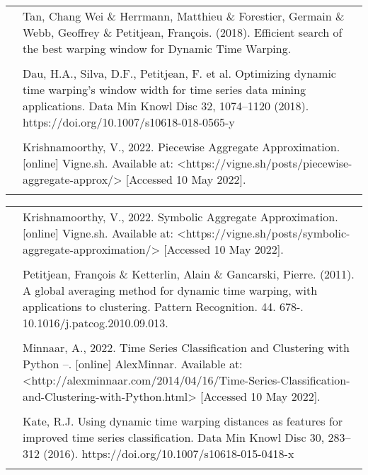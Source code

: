 \documentclass[10pt]{article}
\begin{document}
\begin{multicols}{2}
\begin{tabular}{p{0.5cm} p{7cm}}
			\text{[16]} & Tan, Chang Wei \& Herrmann, Matthieu \& Forestier, Germain \& Webb, Geoffrey \& Petitjean, François. (2018). Efficient search of the best warping window for Dynamic Time Warping.  \\ \\
			
			\text{[17]} & Dau, H.A., Silva, D.F., Petitjean, F. et al. Optimizing dynamic time warping’s window width for time series data mining applications. Data Min Knowl Disc 32, 1074–1120 (2018). https://doi.org/10.1007/s10618-018-0565-y \\ \\
			
			\text{[18]} & Krishnamoorthy, V., 2022. Piecewise Aggregate Approximation. [online] Vigne.sh. Available at: <https://vigne.sh/posts/piecewise-aggregate-approx/> [Accessed 10 May 2022]. \\ \\
		\end{tabular}
			
		\begin{tabular}{p{0.5cm} p{7cm}}
			\text{[19]} & Krishnamoorthy, V., 2022. Symbolic Aggregate Approximation. [online] Vigne.sh. Available at: <https://vigne.sh/posts/symbolic-aggregate-approximation/> [Accessed 10 May 2022].\\ \\
			
			\text{[20]} & Petitjean, François \& Ketterlin, Alain \& Gancarski, Pierre. (2011). A global averaging method for dynamic time warping, with applications to clustering. Pattern Recognition. 44. 678-. 10.1016/j.patcog.2010.09.013. \\ \\
			
			\text{[21]} & Minnaar, A., 2022. Time Series Classification and Clustering with Python –. [online] AlexMinnar. Available at: <http://alexminnaar.com/2014/04/16/Time-Series-Classification-and-Clustering-with-Python.html> [Accessed 10 May 2022].\\ \\
			
			\text{[22]} & Kate, R.J. Using dynamic time warping distances as features for improved time series classification. Data Min Knowl Disc 30, 283–312 (2016). https://doi.org/10.1007/s10618-015-0418-x \\ \\
			
		\end{tabular}
		
	\end{multicols}
\end{document}
